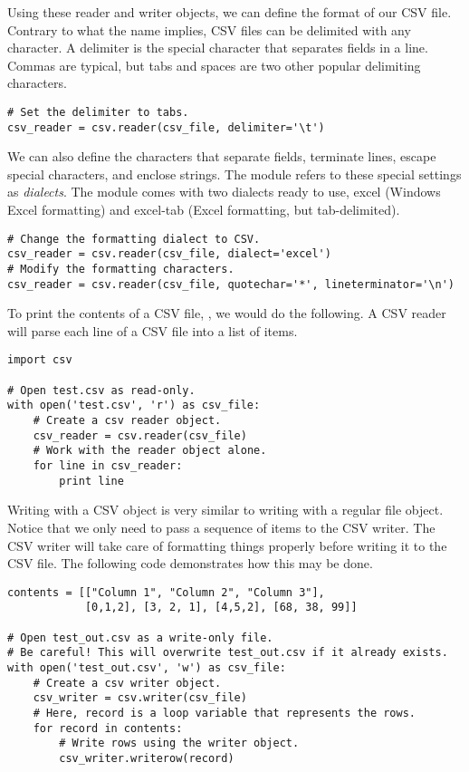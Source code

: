 Using these reader and writer objects, we can define the format of our CSV file.
Contrary to what the name implies, CSV files can be delimited with any character.
A delimiter is the special character that separates fields in a line. Commas are typical, but tabs and spaces are two other popular delimiting characters.
\begin{lstlisting}
# Set the delimiter to tabs.
csv_reader = csv.reader(csv_file, delimiter='\t')
\end{lstlisting}

We can also define the characters that separate fields, terminate lines, escape special characters, and enclose strings.
The  module refers to these special settings as \emph{dialects}.
The module comes with two dialects ready to use, excel (Windows Excel formatting) and excel-tab (Excel formatting, but tab-delimited).
\begin{lstlisting}
# Change the formatting dialect to CSV.
csv_reader = csv.reader(csv_file, dialect='excel')
# Modify the formatting characters.
csv_reader = csv.reader(csv_file, quotechar='*', lineterminator='\n')

\end{lstlisting}

To print the contents of a CSV file, , we would do the following.  A CSV reader will parse each line of a CSV file into a list of items.
\begin{lstlisting}
import csv

# Open test.csv as read-only.
with open('test.csv', 'r') as csv_file:
    # Create a csv reader object.
    csv_reader = csv.reader(csv_file)
    # Work with the reader object alone.
    for line in csv_reader:
        print line
\end{lstlisting}

Writing with a CSV  object is very similar to writing with a regular file object.  Notice that we only need to pass a sequence of items to the CSV writer.  The CSV writer will take care of formatting things properly before writing it to the CSV file.
The following code demonstrates how this may be done.
\begin{lstlisting}
contents = [["Column 1", "Column 2", "Column 3"],
            [0,1,2], [3, 2, 1], [4,5,2], [68, 38, 99]]

# Open test_out.csv as a write-only file.
# Be careful! This will overwrite test_out.csv if it already exists.
with open('test_out.csv', 'w') as csv_file:
    # Create a csv writer object.
    csv_writer = csv.writer(csv_file)
    # Here, record is a loop variable that represents the rows.
    for record in contents:
        # Write rows using the writer object.
        csv_writer.writerow(record)
\end{lstlisting}

